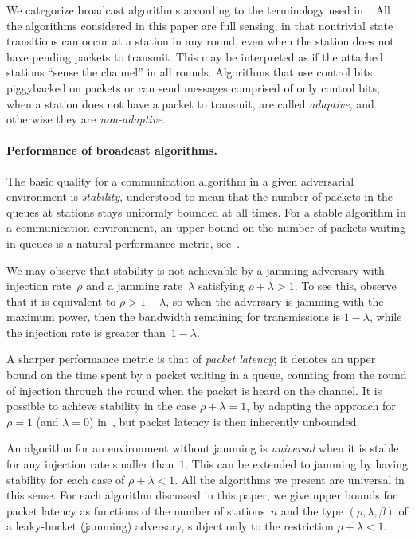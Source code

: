 \documentclass[11pt]{article}
\newcommand{\BBB}{\vspace*{-\bigskipamount}}
\newcommand{\Paragraph}[1]{\BBB\paragraph{#1}}
\begin{document}
We categorize broadcast algorithms according to the terminology used in~\cite{ChlebusKR09, ChlebusKR-TALG12}.
All the algorithms considered in this paper are full sensing, in that nontrivial state transitions can occur at a station in any round, even when the station does not have pending packets to transmit.
This may be interpreted as if the attached stations  ``sense the channel'' in all rounds.
Algorithms that use control bits piggybacked on packets or can send messages comprised of only control bits, when a station does not have a packet to transmit, are called \emph{adaptive}, and otherwise they are \emph{non-adaptive}.




 

\Paragraph{Performance of broadcast algorithms.}



The basic quality for a communication algorithm in a given adversarial environment is \emph{stability},  understood to mean that the number of packets in the queues at stations stays uniformly bounded at all times.
For a stable algorithm in a communication environment, an upper bound on the number of packets waiting in queues is a natural performance metric, see~\cite{ChlebusKR09, ChlebusKR-TALG12}.

We may observe that stability is not achievable by a jamming adversary with injection rate~$\rho$ and a jamming rate~$\lambda$ satisfying $\rho+\lambda>1$. 
To see this, observe that it is equivalent to $\rho>1-\lambda$, so when the adversary is jamming with the maximum power, then the bandwidth remaining for transmissions is $1-\lambda$, while the injection rate is greater than~$1-\lambda$.

A sharper performance metric is that of \emph{packet latency}; it denotes an upper bound on the time spent by a packet waiting in a queue, counting from the round of injection through the round when the packet is heard on the channel. 
It is possible to achieve stability in the case $\rho+\lambda =1$, by adapting the approach for $\rho=1$ (and $\lambda=0$) in~\cite{ChlebusKR09}, but packet latency is then inherently unbounded.


An algorithm for an environment without jamming is \emph{universal} when it is stable for any injection rate smaller than~$1$.
This can be extended to jamming by having stability for each case of $\rho+\lambda < 1$.
All the algorithms we present are universal in this sense.
For each algorithm discussed in this paper, we give upper bounds for packet latency as functions of the number of stations~$n$ and the type $(\rho,\lambda,\beta)$ of a leaky-bucket (jamming) adversary, subject only to the restriction $\rho+\lambda < 1$.
\end{document}
